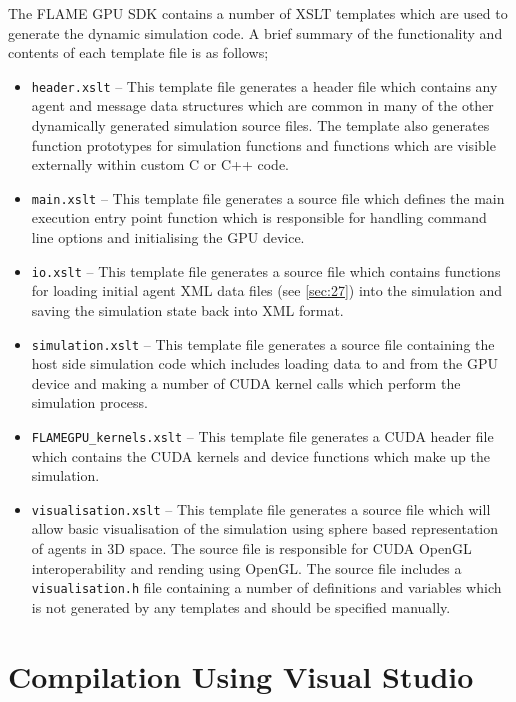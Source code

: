 \documentclass[11pt, a4paper, onecolumn, oneside]{report}
\begin{document}
The FLAME GPU SDK contains a number of XSLT templates which are used to generate the dynamic simulation code.
A brief summary of the functionality and contents of each template file is as follows; 

\begin{itemize}
    \item \texttt{header.xslt} -- This template file generates a header file which contains any agent and message data structures which are common in many of the other dynamically generated simulation source files.
        The template also generates function prototypes for simulation functions and functions which are visible externally within custom C or C++ code.
    \item \texttt{main.xslt} -- This template file generates a source file which defines the main execution entry point function which is responsible for handling command line options and initialising the GPU device.
    \item \texttt{io.xslt} -- This template file generates a source file which contains functions for loading initial agent XML data files (see \cref{sec:27}) into the simulation and saving the simulation state back into XML   format.
    \item \texttt{simulation.xslt} -- This template file generates a source file containing the host side simulation code which includes loading data to and from the GPU device and making a number of CUDA kernel calls which perform the simulation process.
    \item \texttt{FLAMEGPU\_kernels.xslt} -- This template file generates a CUDA header file which contains the CUDA kernels and device functions which make up the simulation.
    \item \texttt{visualisation.xslt} -- This template file generates a source file which will allow basic visualisation of the simulation using sphere based representation of agents in 3D space.
        The source file is responsible for CUDA OpenGL interoperability and rending using OpenGL.
        The source file includes a \texttt{visualisation.h} file containing a number of definitions and variables which is not generated by any templates and should be specified manually.
\end{itemize}

\section{Compilation Using Visual Studio}
\label{sec:44}
\end{document}
